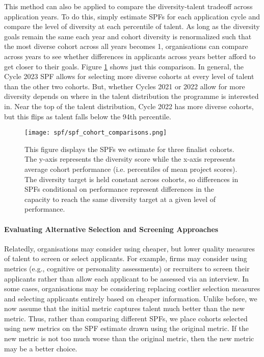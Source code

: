 This method can also be applied to compare the diversity-talent tradeoff across application years. To do this, simply estimate SPFs for each application cycle and compare the level of diversity at each percentile of talent. As long as the diversity goals remain the same each year and cohort diversity is renormalized such that the most diverse cohort across all years becomes 1, organisations can compare across years to see whether differences in applicants across years better afford to get closer to their goals. Figure \ref{fig:diversity_across_cohorts} shows just this comparison. In general, the Cycle 2023 SPF allows for selecting more diverse cohorts at every level of talent than the other two cohorts. But, whether Cycles 2021 or 2022 allow for more diversity depends on where in the talent distribution the programme is interested in. Near the top of the talent distribution, Cycle 2022 has more diverse cohorts, but this flips as talent falls below the 94th percentile.

\begin{figure}[!htb]
    \centering
    \texttt{[image: spf/spf\_cohort\_comparisons.png]} 
    \caption{ This figure displays the SPFs we estimate for three finalist cohorts. The y-axis represents the diversity score while the x-axis represents average cohort performance (i.e. percentiles of mean project scores). The diversity target is held constant across cohorts, so differences in SPFs conditional on performance represent differences in the capacity to reach the same diversity target at a given level of performance.}
    \label{fig:diversity_across_cohorts}
\end{figure}

\paragraph{Evaluating Alternative Selection and Screening Approaches} Relatedly, organisations may consider using cheaper, but lower quality measures of talent to screen or select applicants. For example, firms may consider using metrics (e.g., cognitive or personality assessments) or recruiters to screen their applicants rather than allow each applicant to be assessed via an interview. In some cases, organisations may be considering replacing costlier selection measures and selecting applicants entirely based on cheaper information. Unlike before, we now assume that the initial metric captures talent much better than the new metric. Thus, rather than comparing different SPFs, we place cohorts selected using new metrics on the SPF estimate drawn using the original metric. If the new metric is not too much worse than the original metric, then the new metric may be a better choice.

